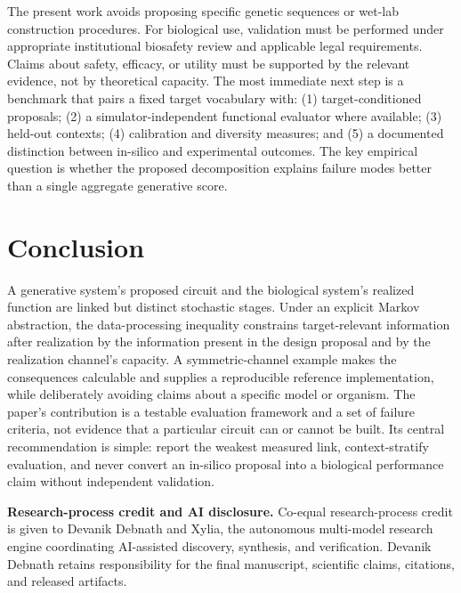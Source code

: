 \documentclass[11pt]{article}
\begin{document}
The present work avoids proposing specific genetic sequences or wet-lab construction procedures. For biological use, validation must be performed under appropriate institutional biosafety review and applicable legal requirements. Claims about safety, efficacy, or utility must be supported by the relevant evidence, not by theoretical capacity. The most immediate next step is a benchmark that pairs a fixed target vocabulary with: (1) target-conditioned proposals; (2) a simulator-independent functional evaluator where available; (3) held-out contexts; (4) calibration and diversity measures; and (5) a documented distinction between in-silico and experimental outcomes. The key empirical question is whether the proposed decomposition explains failure modes better than a single aggregate generative score.

\section{Conclusion}
A generative system's proposed circuit and the biological system's realized function are linked but distinct stochastic stages. Under an explicit Markov abstraction, the data-processing inequality constrains target-relevant information after realization by the information present in the design proposal and by the realization channel's capacity. A symmetric-channel example makes the consequences calculable and supplies a reproducible reference implementation, while deliberately avoiding claims about a specific model or organism. The paper's contribution is a testable evaluation framework and a set of failure criteria, not evidence that a particular circuit can or cannot be built. Its central recommendation is simple: report the weakest measured link, context-stratify evaluation, and never convert an in-silico proposal into a biological performance claim without independent validation.

\vspace{0.5em}
\noindent\textbf{Research-process credit and AI disclosure.} Co-equal research-process credit is given to Devanik Debnath and Xylia, the autonomous multi-model research engine coordinating AI-assisted discovery, synthesis, and verification. Devanik Debnath retains responsibility for the final manuscript, scientific claims, citations, and released artifacts.

\printbibliography
\end{document}
